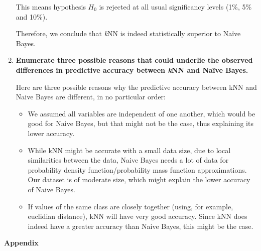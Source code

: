 \documentclass[12pt]{article}
\begin{document}
\begin{enumerate}[leftmargin=\labelsep,resume]
          This means hypothesis $H_0$ is rejected at all usual significancy levels
          (1\%, 5\% and 10\%).

          Therefore, we conclude that \textit{k}NN is indeed statistically superior
          to Naïve Bayes.

    \item {\bfseries
          Enumerate three possible reasons that could underlie the observed differences in predictive accuracy between \textit{k}NN and Naïve
          Bayes.
          }

          Here are three possible reasons why the predictive accuracy between kNN and Naive Bayes are different, in no particular order:

          \begin{itemize}
              \item We assumed all variables are independent of one another,
                    which would be good for Naive Bayes, but that might not
                    be the case, thus explaining its lower accuracy.
              \item While kNN might be accurate with a small data size, due to
                    local similarities between the data, Naive Bayes needs a lot
                    of data for probability density function/probability
                    mass function approximations.
                    Our dataset is of moderate size, which might explain
                    the lower accuracy of Naive Bayes.
              \item If values of the same class are closely together
                    (using, for example, euclidian distance),
                    kNN will have very good accuracy.
                    Since kNN does indeed have a greater accuracy than
                    Naive Bayes, this might be the case.
          \end{itemize}
\end{enumerate}

\center\large{\textbf{Appendix}\vskip 0.3cm}
\end{document}

